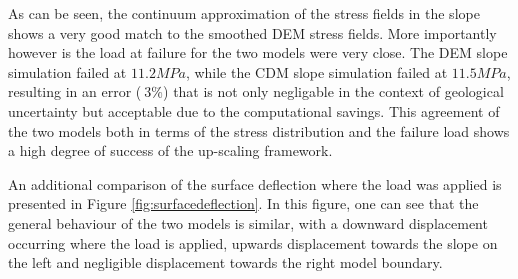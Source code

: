 As can be seen, the continuum approximation of the stress fields in the slope shows a very good match to the smoothed DEM stress fields. More importantly however is the load at failure for the two models were very close. The DEM slope simulation failed at $11.2 MPa$, while the CDM slope simulation failed at $11.5 MPa$, resulting in an error ($~3\%$) that is not only negligable in the context of geological uncertainty but acceptable due to the computational savings. This agreement of the two models both in terms of the stress distribution and the failure load shows a high degree of success of the up-scaling framework. 

An additional comparison of the surface deflection where the load was applied is presented in Figure \ref{fig:surfacedeflection}. In this figure, one can see that the general behaviour of the two models is similar, with a downward displacement occurring where the load is applied, upwards displacement towards the slope on the left and negligible displacement towards the right model boundary. 